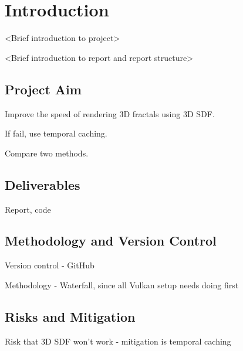 \chapter{Introduction}
\label{chapter1}

<Brief introduction to project>

<Brief introduction to report and report structure>

\section{Project Aim}

Improve the speed of rendering 3D fractals using 3D SDF.

If fail, use temporal caching.

Compare two methods.

\section{Deliverables}

Report, code

\section{Methodology and Version Control}

Version control - GitHub

Methodology - Waterfall, since all Vulkan setup needs doing first

\section{Risks and Mitigation}

Risk that 3D SDF won't work - mitigation is temporal caching